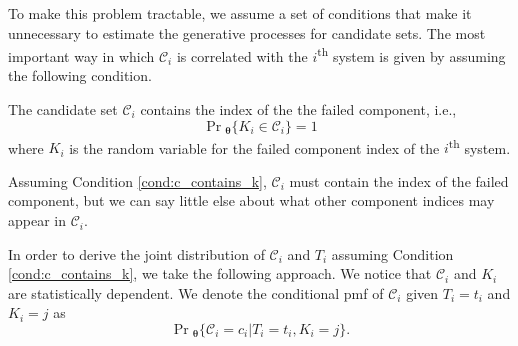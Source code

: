 \documentclass[
]{article}
\begin{document}
To make this problem tractable, we assume a set of conditions that make
it unnecessary to estimate the generative processes for candidate sets.
The most important way in which \(\mathcal{C}_i\) is correlated with the
\(i\)\textsuperscript{th} system is given by assuming the following
condition.

\begin{condition}
\label{cond:c_contains_k}
The candidate set $\mathcal{C}_i$ contains the index of the the failed component, i.e.,
$$
\Pr{}_{\!\boldsymbol{\theta}}\{K_i \in \mathcal{C}_i\} = 1
$$
where $K_i$ is the random variable for the failed component index of the
$i$\textsuperscript{th} system.
\end{condition}

Assuming Condition \ref{cond:c_contains_k}, \(\mathcal{C}_i\) must
contain the index of the failed component, but we can say little else
about what other component indices may appear in \(\mathcal{C}_i\).

In order to derive the joint distribution of \(\mathcal{C}_i\) and
\(T_i\) assuming Condition \ref{cond:c_contains_k}, we take the
following approach. We notice that \(\mathcal{C}_i\) and \(K_i\) are
statistically dependent. We denote the conditional pmf of
\(\mathcal{C}_i\) given \(T_i = t_i\) and \(K_i = j\) as \[
\Pr{}_{\!\boldsymbol{\theta}}\{\mathcal{C}_i = c_i | T_i = t_i, K_i = j\}.
\]
\end{document}
